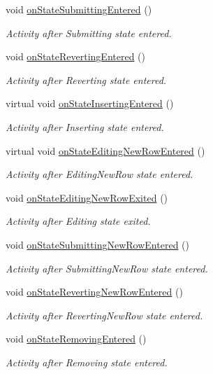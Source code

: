 \begin{DoxyCompactItemize}
void \hyperlink{classmdt_abstract_sql_table_controller_a22c94c035f833168bf5dee9964f6830d}{on\-State\-Submitting\-Entered} ()
\begin{DoxyCompactList}\small\item\em Activity after Submitting state entered. \end{DoxyCompactList}\item 
void \hyperlink{classmdt_abstract_sql_table_controller_ae08f954918538cbdd1257d4fecef184e}{on\-State\-Reverting\-Entered} ()
\begin{DoxyCompactList}\small\item\em Activity after Reverting state entered. \end{DoxyCompactList}\item 
virtual void \hyperlink{classmdt_abstract_sql_table_controller_a62b31d537021405a6b28e74dc5c6cdd9}{on\-State\-Inserting\-Entered} ()
\begin{DoxyCompactList}\small\item\em Activity after Inserting state entered. \end{DoxyCompactList}\item 
virtual void \hyperlink{classmdt_abstract_sql_table_controller_a6a17e3453d754109711fa372b2a1a344}{on\-State\-Editing\-New\-Row\-Entered} ()
\begin{DoxyCompactList}\small\item\em Activity after Editing\-New\-Row state entered. \end{DoxyCompactList}\item 
void \hyperlink{classmdt_abstract_sql_table_controller_a6700c4d17a701cf3758e4e43ac1ccb05}{on\-State\-Editing\-New\-Row\-Exited} ()
\begin{DoxyCompactList}\small\item\em Activity after Editing state exited. \end{DoxyCompactList}\item 
void \hyperlink{classmdt_abstract_sql_table_controller_ac05b5fced9eef33ad1bb7442af991ab6}{on\-State\-Submitting\-New\-Row\-Entered} ()
\begin{DoxyCompactList}\small\item\em Activity after Submitting\-New\-Row state entered. \end{DoxyCompactList}\item 
void \hyperlink{classmdt_abstract_sql_table_controller_a6d27343c80072d91d7c8ecf15cfde94d}{on\-State\-Reverting\-New\-Row\-Entered} ()
\begin{DoxyCompactList}\small\item\em Activity after Reverting\-New\-Row state entered. \end{DoxyCompactList}\item 
void \hyperlink{classmdt_abstract_sql_table_controller_acb2f06b1b4cb4ec4af3f4695aa9ab0e4}{on\-State\-Removing\-Entered} ()
\begin{DoxyCompactList}\small\item\em Activity after Removing state entered. \end{DoxyCompactList}\end{DoxyCompactItemize}
